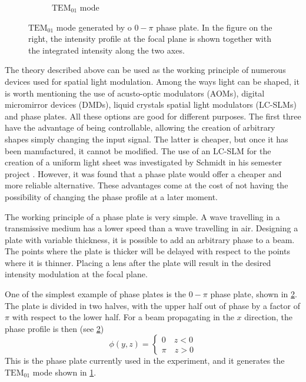 \begin{figure}
\begin{subfigure}[t]{0.6\textwidth}
        \caption{$\text{TEM}_{01}$ mode}
        \label{fig:tem10}
    \end{subfigure}
    \caption{$\text{TEM}_{01}$ mode generated by o $0-\pi$ phase plate. In the figure on the right, the intensity profile at the focal plane is shown together with the integrated intensity along the two axes.}
    \label{fig:0pi}
\end{figure}
The theory described above can be used as the working principle of numerous devices used for spatial light modulation. Among the ways light can be shaped, it is worth mentioning the use of acusto-optic modulators (AOMs), digital micromirror devices (DMDs), liquid crystals spatial light modulators (LC-SLMs) and phase plates. All these options are good for different purposes. The first three have the advantage of being controllable, allowing the creation of arbitrary shapes simply changing the input signal. The latter is cheaper, but once it has been manufactured, it cannot be modified.
The use of an LC-SLM for the creation of a uniform light sheet was investigated by Schmidt in his semester project \cite{schmidt2021}. However, it was found that a phase plate would offer a cheaper and more reliable alternative. These advantages come at the cost of not having the possibility of changing the phase profile at a later moment.

The working principle of a phase plate is very simple. A wave travelling in a transmissive medium has a lower speed than a wave travelling in air. Designing a plate with variable thickness, it is possible to add an arbitrary phase to a beam. The points where the plate is thicker will be delayed with respect to the points where it is thinner. Placing a lens after the plate will result in the desired intensity modulation at the focal plane.

One of the simplest example of phase plates is the $0-\pi$ phase plate, shown in \cref{fig:0pi}. The plate is divided in two halves, with the upper half out of phase by a factor of $\pi$ with respect to the lower half. For a beam propagating in the $x$ direction, the phase profile is then (see \cref{fig:0pi})
\begin{equation}
    \phi(y,z) =
    \begin{cases}
        0 \quad z < 0 \\
        \pi \quad z > 0
    \end{cases}
\end{equation}
This is the phase plate currently used in the experiment, and it generates the $\text{TEM}_{01}$ mode shown in \cref{fig:tem10}.


